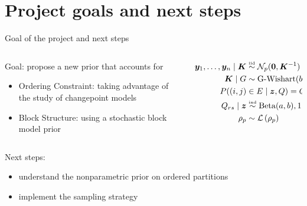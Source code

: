 \section{Project goals and next steps}
\begin{frame}{Goal of the project and next steps}

\vspace*{0.5cm}
\begin{columns}

    \begin{column}{0.4\textwidth}
        \alert{Goal:} propose a \alert{new prior} that accounts for
        \begin{itemize}
            \item Ordering Constraint: taking advantage of the study of changepoint models
            \item Block Structure: using a stochastic block model prior
        \end{itemize}
    \end{column}
    \begin{column}{0.6\textwidth}
        \begin{align*}
        \bm{y}_1, \ldots, \bm{y}_n \mid \bm{K} & \overset{\text{\tiny{iid}}}{\sim} \mathcal{N}_p(\mathbf{0}, \bm{K}^{-1} ) \\
        \bm{K} \mid G & \sim \operatorname{G-Wishart}(b, D)\\
        P((i,j)&\in E\mid \bm{z},Q) = Q_{z_{i} z_{j}},\,\text{independent}\\
            Q_{rs} \mid \bm{z} &\overset{\text{\tiny{ind}}}{\sim} \operatorname{Beta}(a,b), 1\leq r\leq s\leq H\\
        \rho_p & \sim \mathcal{L}\left(\rho_p\right)
        \end{align*}  
    \end{column}
\end{columns}
\vspace*{0.5cm}


\pause\alert{Next steps:}
\begin{itemize}
\item understand the nonparametric prior on ordered partitions
\item implement the sampling strategy
\end{itemize}

\end{frame}

